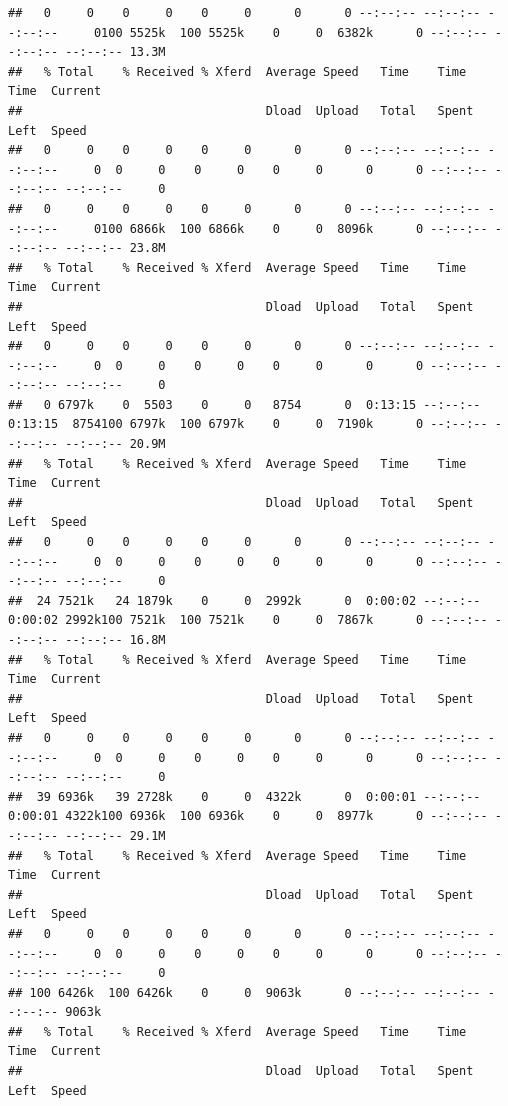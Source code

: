 \documentclass[
]{book}
\begin{document}
\begin{verbatim}
##   0     0    0     0    0     0      0      0 --:--:-- --:--:-- --:--:--     0100 5525k  100 5525k    0     0  6382k      0 --:--:-- --:--:-- --:--:-- 13.3M
##   % Total    % Received % Xferd  Average Speed   Time    Time     Time  Current
##                                  Dload  Upload   Total   Spent    Left  Speed
##   0     0    0     0    0     0      0      0 --:--:-- --:--:-- --:--:--     0  0     0    0     0    0     0      0      0 --:--:-- --:--:-- --:--:--     0
##   0     0    0     0    0     0      0      0 --:--:-- --:--:-- --:--:--     0100 6866k  100 6866k    0     0  8096k      0 --:--:-- --:--:-- --:--:-- 23.8M
##   % Total    % Received % Xferd  Average Speed   Time    Time     Time  Current
##                                  Dload  Upload   Total   Spent    Left  Speed
##   0     0    0     0    0     0      0      0 --:--:-- --:--:-- --:--:--     0  0     0    0     0    0     0      0      0 --:--:-- --:--:-- --:--:--     0
##   0 6797k    0  5503    0     0   8754      0  0:13:15 --:--:--  0:13:15  8754100 6797k  100 6797k    0     0  7190k      0 --:--:-- --:--:-- --:--:-- 20.9M
##   % Total    % Received % Xferd  Average Speed   Time    Time     Time  Current
##                                  Dload  Upload   Total   Spent    Left  Speed
##   0     0    0     0    0     0      0      0 --:--:-- --:--:-- --:--:--     0  0     0    0     0    0     0      0      0 --:--:-- --:--:-- --:--:--     0
##  24 7521k   24 1879k    0     0  2992k      0  0:00:02 --:--:--  0:00:02 2992k100 7521k  100 7521k    0     0  7867k      0 --:--:-- --:--:-- --:--:-- 16.8M
##   % Total    % Received % Xferd  Average Speed   Time    Time     Time  Current
##                                  Dload  Upload   Total   Spent    Left  Speed
##   0     0    0     0    0     0      0      0 --:--:-- --:--:-- --:--:--     0  0     0    0     0    0     0      0      0 --:--:-- --:--:-- --:--:--     0
##  39 6936k   39 2728k    0     0  4322k      0  0:00:01 --:--:--  0:00:01 4322k100 6936k  100 6936k    0     0  8977k      0 --:--:-- --:--:-- --:--:-- 29.1M
##   % Total    % Received % Xferd  Average Speed   Time    Time     Time  Current
##                                  Dload  Upload   Total   Spent    Left  Speed
##   0     0    0     0    0     0      0      0 --:--:-- --:--:-- --:--:--     0  0     0    0     0    0     0      0      0 --:--:-- --:--:-- --:--:--     0
## 100 6426k  100 6426k    0     0  9063k      0 --:--:-- --:--:-- --:--:-- 9063k
##   % Total    % Received % Xferd  Average Speed   Time    Time     Time  Current
##                                  Dload  Upload   Total   Spent    Left  Speed

\end{verbatim}
\end{document}
